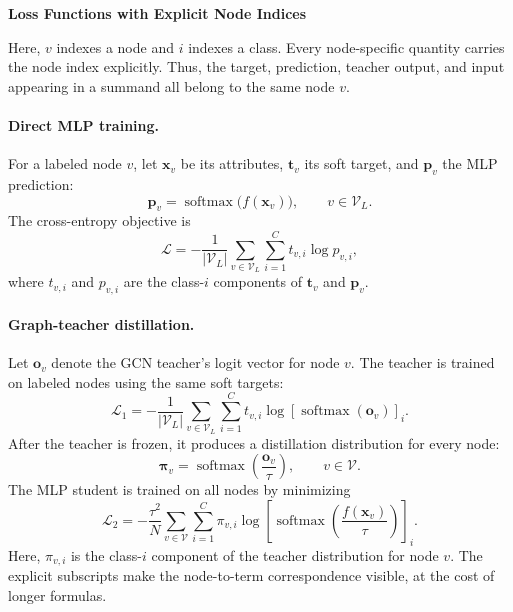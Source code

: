 \documentclass[10pt]{article}
\begin{document}
\begin{center}\large\bfseries Loss Functions with Explicit Node Indices\end{center}

Here, \(v\) indexes a node and \(i\) indexes a class. Every node-specific quantity carries the node index explicitly. Thus, the target, prediction, teacher output, and input appearing in a summand all belong to the same node \(v\).

\paragraph{Direct MLP training.}
For a labeled node \(v\), let \(\mathbf{x}_v\) be its attributes, \(\mathbf{t}_v\) its soft target, and \(\mathbf{p}_v\) the MLP prediction:
\begin{equation}
\mathbf{p}_v=\operatorname{softmax}\bigl(f(\mathbf{x}_v)\bigr),
\qquad v\in\mathcal{V}_L.
\end{equation}
The cross-entropy objective is
\begin{equation}
\mathcal{L}
=-\frac{1}{|\mathcal{V}_L|}
\sum_{v\in\mathcal{V}_L}\sum_{i=1}^{C}
t_{v,i}\log p_{v,i},
\end{equation}
where \(t_{v,i}\) and \(p_{v,i}\) are the class-\(i\) components of \(\mathbf{t}_v\) and \(\mathbf{p}_v\).

\paragraph{Graph-teacher distillation.}
Let \(\mathbf{o}_v\) denote the GCN teacher's logit vector for node \(v\). The teacher is trained on labeled nodes using the same soft targets:
\begin{equation}
\mathcal{L}_1
=-\frac{1}{|\mathcal{V}_L|}
\sum_{v\in\mathcal{V}_L}\sum_{i=1}^{C}
t_{v,i}\log\left[\operatorname{softmax}(\mathbf{o}_v)\right]_i.
\end{equation}
After the teacher is frozen, it produces a distillation distribution for every node:
\begin{equation}
\boldsymbol{\pi}_v
=\operatorname{softmax}\left(\frac{\mathbf{o}_v}{\tau}\right),
\qquad v\in\mathcal{V}.
\end{equation}
The MLP student is trained on all nodes by minimizing
\begin{equation}
\mathcal{L}_2
=-\frac{\tau^2}{N}
\sum_{v\in\mathcal{V}}\sum_{i=1}^{C}
\pi_{v,i}
\log\left[
\operatorname{softmax}\left(\frac{f(\mathbf{x}_v)}{\tau}\right)
\right]_i.
\end{equation}
Here, \(\pi_{v,i}\) is the class-\(i\) component of the teacher distribution for node \(v\). The explicit subscripts make the node-to-term correspondence visible, at the cost of longer formulas.
\end{document}
